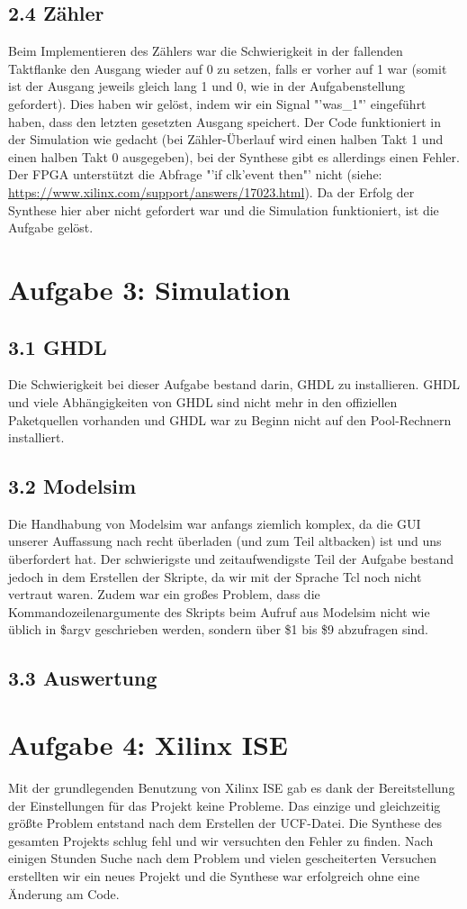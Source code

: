 \documentclass[parskip=full]{scrartcl}
\begin{document}
		\subsection*{2.4 Zähler}
			Beim Implementieren des Zählers war die Schwierigkeit in der fallenden Taktflanke den Ausgang wieder auf 0 zu setzen, falls er vorher auf 1 war (somit ist der Ausgang jeweils gleich lang 1 und 0, wie in der Aufgabenstellung gefordert). Dies haben wir gelöst, indem wir ein Signal "'was\_1"' eingeführt haben, dass den letzten gesetzten Ausgang speichert. Der Code funktioniert in der Simulation wie gedacht (bei Zähler-Überlauf wird einen halben Takt 1 und einen halben Takt 0 ausgegeben), bei der Synthese gibt es allerdings einen Fehler. Der FPGA unterstützt die Abfrage "'if clk'event then"' nicht (siehe: \url{https://www.xilinx.com/support/answers/17023.html}). Da der Erfolg der Synthese hier aber nicht gefordert war und die Simulation funktioniert, ist die Aufgabe gelöst.
	\section*{Aufgabe 3: Simulation}
		\subsection*{3.1 GHDL}
			Die Schwierigkeit bei dieser Aufgabe bestand darin, GHDL zu installieren. GHDL und viele Abhängigkeiten von GHDL sind nicht mehr in den offiziellen Paketquellen vorhanden und GHDL war zu Beginn nicht auf den Pool-Rechnern installiert.
		\subsection*{3.2 Modelsim}
			Die Handhabung von Modelsim war anfangs ziemlich komplex, da die GUI unserer Auffassung nach recht überladen (und zum Teil altbacken) ist und uns überfordert hat. Der schwierigste und zeitaufwendigste Teil der Aufgabe bestand jedoch in dem Erstellen der Skripte, da wir mit der Sprache Tcl noch nicht vertraut waren. Zudem war ein großes Problem, dass die Kommandozeilenargumente des Skripts beim Aufruf aus Modelsim nicht wie üblich in \$argv geschrieben werden, sondern über \$1 bis \$9 abzufragen sind.
		\subsection*{3.3 Auswertung}
	\section*{Aufgabe 4: Xilinx ISE}
		Mit der grundlegenden Benutzung von Xilinx ISE gab es dank der Bereitstellung der Einstellungen für das Projekt keine Probleme. Das einzige und gleichzeitig größte Problem entstand nach dem Erstellen der UCF-Datei. Die Synthese des gesamten Projekts schlug fehl und wir versuchten den Fehler zu finden. Nach einigen Stunden Suche nach dem Problem und vielen gescheiterten Versuchen erstellten wir ein neues Projekt und die Synthese war erfolgreich ohne eine Änderung am Code.
		
\end{document}
